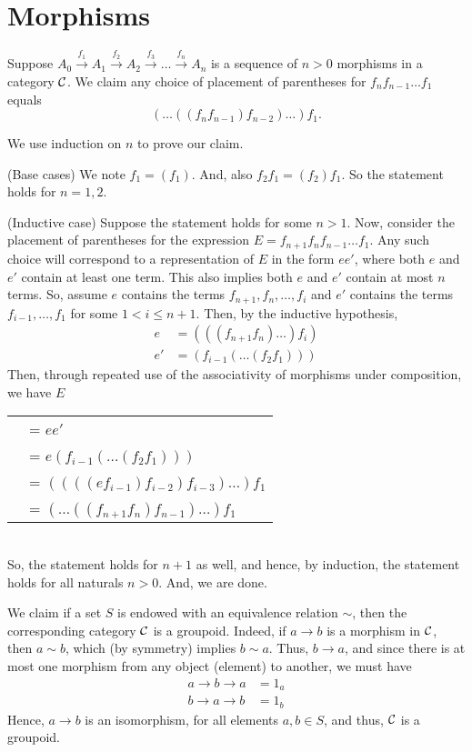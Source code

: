 \section{Morphisms}
\begin{xca}
Suppose $A_0 \xrightarrow{f_1} A_1 \xrightarrow{f_2} A_2 \xrightarrow{f_3}
\ldots \xrightarrow{f_n} A_n$ is a sequence of $n > 0$ morphisms in a
category $\mathcal{C}$. We claim any choice of placement of parentheses for $f_n
f_{n-1} \ldots f_1$ equals
\[(\ldots ((f_n f_{n-1}) f_{n-2}) \ldots) f_1.\]

We use induction on $n$ to prove our claim.

(Base cases) We note $f_1 = (f_1)$. And, also $f_2 f_1 = (f_2) f_1$. So the
statement holds for $n = 1, 2$.

(Inductive case) Suppose the statement holds for some $n > 1$. Now, consider
the placement of parentheses for the expression $E = f_{n+1} f_n f_{n-1} \ldots
f_1$. Any such choice will correspond to a representation of $E$ in the form
$e e'$, where both $e$ and $e'$ contain at least one term. This also implies
both $e$ and $e'$ contain at most $n$ terms. So, assume $e$ contains the terms
$f_{n+1}, f_n, \ldots, f_i$ and $e'$ contains the terms $f_{i-1}, \ldots, f_1$
for some $1 < i \le n + 1$. Then, by the inductive hypothesis,
\begin{align*}
    e &= (((f_{n+1} f_n) \ldots) f_i) \\
    e' &= (f_{i-1}(\ldots (f_2 f_1)))
\end{align*}
Then, through repeated use of the associativity of morphisms under composition,
we have $E$ \\
\begin{tabular}{l l}
    &= $e e'$ \\
    &= $e (f_{i-1}(\ldots (f_2 f_1)))$ \\
    &= $((((e f_{i-1}) f_{i-2}) f_{i-3}) \ldots) f_1$ \\
    &= $(\ldots ((f_{n+1} f_n) f_{n-1}) \ldots) f_1$
\end{tabular}
~\\

So, the statement holds for $n+1$ as well, and hence, by induction, the
statement holds for all naturals $n > 0$. And, we are done.
\end{xca}

\begin{xca}
We claim if a set $S$ is endowed with an equivalence relation $\sim$, then the
corresponding category $\mathcal{C}$ is a groupoid. Indeed, if $a \to b$ is a
morphism in $\mathcal{C}$, then $a \sim b$, which (by symmetry) implies $b \sim a$.
Thus, $b \to a$, and since there is at most one morphism from any object
(element) to another, we must have
\begin{align*}
    a \to b \to a &= 1_a \\
    b \to a \to b &= 1_b
\end{align*}
Hence, $a \to b$ is an isomorphism, for all elements $a, b \in S$, and thus,
$\mathcal{C}$ is a groupoid.
\end{xca}

